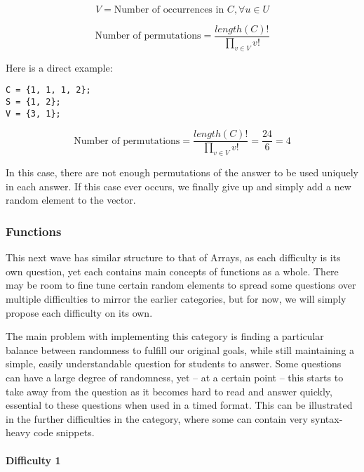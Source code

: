 \documentclass{article}
\begin{document}
\begin{equation*}
V = \textrm{Number of occurrences in } C, \! \forall\! u \in U
\end{equation*}

\begin{equation*}
\textrm{Number of permutations} = \frac{length(C)!}{\displaystyle \prod_{v \in V} v!}
\end{equation*}

\noindent Here is a direct example:

\begin{Verbatim}
C = {1, 1, 1, 2};
S = {1, 2}; 
V = {3, 1};
\end{Verbatim}
\begin{equation*}
\textrm{Number of permutations} = \frac{length(C)!}{\displaystyle \prod_{v \in V} v!} = \frac{24}{6} = 4
\end{equation*}

In this case, there are not enough permutations of the answer to be used uniquely in each answer. If this case ever occurs, we finally give up and simply add a new random element to the 
vector.

\subsubsection{Functions}

This next wave has similar structure to that of Arrays, as each difficulty is its own question, yet each contains main concepts of functions as a whole. There may be room to fine tune certain 
random elements to spread some questions over multiple difficulties to mirror the earlier categories, but for now, we will simply propose each difficulty on its own. 

The main problem with implementing this category is finding a particular balance between randomness to fulfill our original goals, while still maintaining a simple, easily understandable question for students to answer. Some questions can have a large degree of randomness, yet -- at a certain point -- this starts to take away from the question as it becomes hard to read and answer quickly, essential to these questions when used in a timed format. This can be illustrated in the further difficulties in the category, where some can contain very syntax-heavy code snippets.

\paragraph{Difficulty 1} \hfill \par
\end{document}
